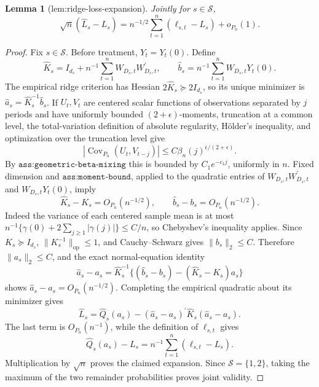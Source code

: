 \documentclass{article}
\newtheorem{lemma}{Lemma}
\begin{document}
\begin{lemma}[lem:ridge-loss-expansion]\label{lem:ridge-loss-expansion}
Jointly for \(s\in\mathcal S\),
\[
 \sqrt n(\widehat L_s-L_s)
 =n^{-1/2}\sum_{t=1}^n(\ell_{s,t}-L_s)+o_{P_n}(1).
\]
\end{lemma}
\begin{proof}
Fix \(s\in\mathcal S\).  Before treatment, \(Y_t=Y_t(0)\).  Define
\[
 \widehat K_s=I_{d_s}+n^{-1}\sum_{t=1}^nW_{D_s,t}W_{D_s,t}^{\prime},
 \qquad
 \widehat b_s=n^{-1}\sum_{t=1}^nW_{D_s,t}Y_t(0).
\]
The empirical ridge criterion has Hessian \(2\widehat K_s\succeq2I_{d_s}\), so its unique minimizer is \(\widehat a_s=\widehat K_s^{-1}\widehat b_s\).  If \(U_t,V_t\) are centered scalar functions of observations separated by \(j\) periods and have uniformly bounded \((2+\epsilon)\)-moments, truncation at a common level, the total-variation definition of absolute regularity, H\"older's inequality, and optimization over the truncation level give
\[
 |\operatorname{Cov}_{P_n}(U_t,V_{t-j})|
 \leq C\beta_n(j)^{\epsilon/(2+\epsilon)}.
\]
By \(\texttt{ass:geometric-beta-mixing}\) this is bounded by \(C_1e^{-c_1j}\), uniformly in \(n\).  Fixed dimension and \(\texttt{ass:moment-bound}\), applied to the quadratic entries of \(W_{D_s,t}W_{D_s,t}^{\prime}\) and \(W_{D_s,t}Y_t(0)\), imply
\[
 \widehat K_s-K_s=O_{P_n}(n^{-1/2}),
 \qquad \widehat b_s-b_s=O_{P_n}(n^{-1/2}).
\]
Indeed the variance of each centered sample mean is at most \(n^{-1}\{\gamma(0)+2\sum_{j\geq1}|\gamma(j)|\}\leq C/n\), so Chebyshev's inequality applies.  Since \(K_s\succeq I_{d_s}\), \(\|K_s^{-1}\|_{\mathrm{op}}\leq1\), and Cauchy--Schwarz gives \(\|b_s\|_2\leq C\).  Therefore \(\|a_s\|_2\leq C\), and the exact normal-equation identity
\[
 \widehat a_s-a_s
 =\widehat K_s^{-1}\{(\widehat b_s-b_s)
  -(\widehat K_s-K_s)a_s\}
\]
shows \(\widehat a_s-a_s=O_{P_n}(n^{-1/2})\).  Completing the empirical quadratic about its minimizer gives
\[
 \widehat L_s
 =\widehat Q_s(a_s)
  -(\widehat a_s-a_s)^{\prime}\widehat K_s(\widehat a_s-a_s).
\]
The last term is \(O_{P_n}(n^{-1})\), while the definition of \(\ell_{s,t}\) gives
\[
 \widehat Q_s(a_s)-L_s=n^{-1}\sum_{t=1}^n(\ell_{s,t}-L_s).
\]
Multiplication by \(\sqrt n\) proves the claimed expansion.  Since \(\mathcal S=\{1,2\}\), taking the maximum of the two remainder probabilities proves joint validity.
\end{proof}
\end{document}
